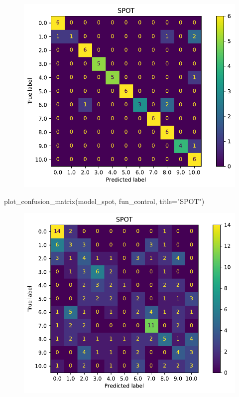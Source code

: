 \documentclass[
  letterpaper,
  DIV=11,
  numbers=noendperiod]{scrreprt}
\newenvironment{Shaded}{\begin{snugshade}}{\end{snugshade}}
\newcommand{\NormalTok}[1]{\textcolor[rgb]{0.00,0.23,0.31}{#1}}
\newcommand{\OperatorTok}[1]{\textcolor[rgb]{0.37,0.37,0.37}{#1}}
\newcommand{\StringTok}[1]{\textcolor[rgb]{0.13,0.47,0.30}{#1}}
\begin{document}
\begin{figure}[H]

{\centering \includegraphics{17_spot_hpt_sklearn_multiclass_classification_xgb_files/figure-pdf/cell-41-output-1.pdf}

}

\end{figure}

\begin{Shaded}
\begin{Highlighting}[]
\NormalTok{plot\_confusion\_matrix(model\_spot, fun\_control, title}\OperatorTok{=}\StringTok{"SPOT"}\NormalTok{)}
\end{Highlighting}
\end{Shaded}

\begin{figure}[H]

{\centering \includegraphics{17_spot_hpt_sklearn_multiclass_classification_xgb_files/figure-pdf/cell-42-output-1.pdf}

}

\end{figure}
\end{document}
